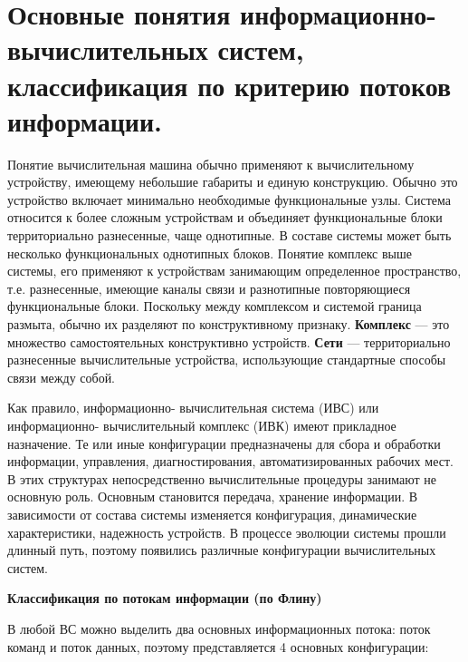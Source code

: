 \documentclass[unicode, 12pt, a4paper, oneside]{article}
\begin{document}
\section{Основные понятия информационно-вычислительных систем, классификация по критерию потоков информации.}

Понятие вычислительная машина обычно применяют к вычислительному устройству, имеющему небольшие габариты и единую конструкцию. Обычно это устройство включает минимально необходимые функциональные узлы. Система относится к более сложным устройствам и объединяет функциональные блоки территориально разнесенные, чаще однотипные. В составе системы может быть несколько функциональных однотипных блоков. Понятие комплекс выше системы, его применяют к устройствам занимающим определенное пространство, т.е. разнесенные, имеющие каналы связи и разнотипные повторяющиеся функциональные блоки. Поскольку между комплексом и системой граница размыта, обычно их разделяют по конструктивному признаку. \textbf{Комплекс} --- это множество самостоятельных конструктивно устройств. \textbf{Сети} --- территориально разнесенные вычислительные устройства, использующие стандартные способы связи между собой.

Как правило, информационно- вычислительная система (ИВС) или информационно- вычислительный комплекс (ИВК) имеют прикладное назначение. Те или иные конфигурации предназначены для сбора и обработки информации, управления, диагностирования, автоматизированных рабочих мест. В этих структурах непосредственно вычислительные процедуры занимают не основную роль. Основным становится передача, хранение информации. В зависимости от состава системы изменяется конфигурация, динамические характеристики, надежность устройств. В процессе эволюции системы прошли длинный путь, поэтому появились различные конфигурации вычислительных систем.

\textbf{Классификация по потокам информации (по Флину)}

В любой ВС можно выделить два основных информационных потока: поток команд и поток данных, поэтому представляется 4 основных конфигурации:
\end{document}
